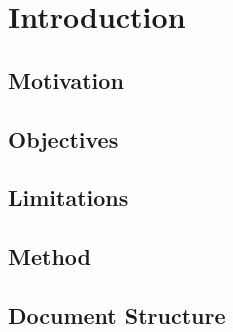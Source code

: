 \chapter{Introduction}

\section{Motivation}

\section{Objectives}

\section{Limitations}

\section{Method}

\section{Document Structure}

